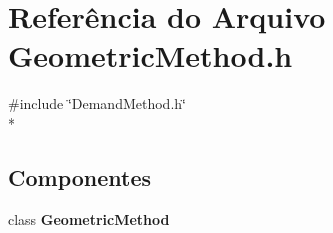 \section{Referência do Arquivo Geometric\+Method.\+h}
\label{_geometric_method_8h}
{\ttfamily \#include \char`\"{}Demand\+Method.\+h\char`\"{}}\\*
\subsection*{Componentes}
\begin{DoxyCompactItemize}
\item 
class {\bf Geometric\+Method}
\end{DoxyCompactItemize}

